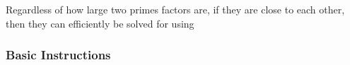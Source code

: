 {{Regardless of how large two primes factors are, if they are close to each other, then they can efficiently be solved for using \href{https://en.wikipedia.org/wiki/Fermat







                    \textbf{\textit{As a final reminder, please do not look at the other instructions.}}







            }







\newpage







\label{subsec:CTFs-gb}






























    \label{subsubsec:CTFs-gb-instructions}















        \subsubsection{Basic Instructions}







            {\parindent0pt\singlespacing







}}}
